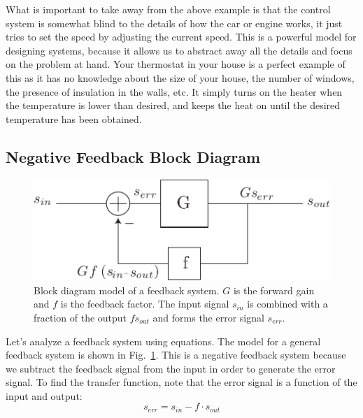 What is important to take away from the above example is that the control system is somewhat blind to the details of how the car or engine works, it just tries to set the speed by adjusting the current speed.  This is a powerful model for designing systems, because it allows us to abstract away all the details and focus on the problem at hand.  Your thermostat in your house is a perfect example of this as it has no knowledge about the size of your house, the number of windows, the presence of insulation in the walls, etc.  It simply turns on the heater when the temperature is lower than desired, and keeps the heat on until the desired temperature has been obtained.  
\subsection{Negative Feedback Block Diagram}
\begin{figure}[tb]
\centering
\includegraphics[scale=.7]{fbblock2}
\caption{Block diagram model of a feedback system.  $G$ is the forward gain and $f$ is the feedback factor.  The input signal $s_{in}$ is combined with a fraction of the output $f s_{out}$ and forms the error signal $s_{err}$.}
\label{fig:fbblock2}
\end{figure}
Let's analyze a feedback system using equations.  The model for a general feedback system is shown in Fig.~\ref{fig:fbblock2}.  This is a negative feedback system because we subtract the feedback signal from the input in order to generate the error signal.
To find the transfer function, note that the error signal is a function of the input and output:
    \begin{equation}
        {s_{err}} = {s_{in}} - f \cdot {s_{out}}
    \end{equation}
